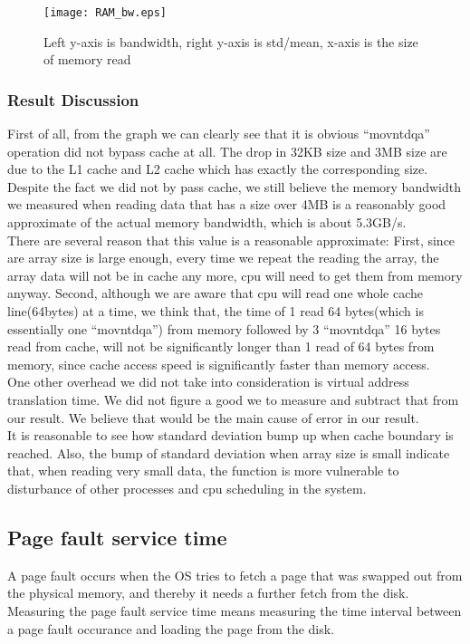 \documentclass{article} %
\begin{document}
\begin{figure}[!htb]
\centering
\texttt{[image: RAM\_bw.eps]}
\caption{Left y-axis is bandwidth, right y-axis is std/mean, x-axis is the size of memory read}
\label{fig:ram_bw}
\end{figure}

\subsubsection{Result Discussion}
First of all, from the graph we can clearly see that it is obvious ``movntdqa'' operation did not bypass cache at all. The drop in 32KB size and 3MB size are due to the L1 cache and L2 cache which has exactly the corresponding size. Despite the fact we did not by pass cache, we still believe the memory bandwidth we measured when reading data that has a size over 4MB is a reasonably good approximate of the actual memory bandwidth, which is about 5.3GB/s.\\
There are several reason that this value is a reasonable approximate: First, since are array size is large enough, every time we repeat the reading the array, the array data will not be in cache any more, cpu will need to get them from memory anyway. Second, although we are aware that cpu will read one whole cache line(64bytes) at a time, we think that, the time of 1 read 64 bytes(which is essentially one ``movntdqa'') from memory followed by 3 ``movntdqa'' 16 bytes read from cache, will not be significantly longer than 1 read of 64 bytes from memory, since cache access speed is significantly faster than memory access.\\
One other overhead we did not take into consideration is virtual address translation time. We did not figure a good we to measure and subtract that from our result. We believe that would be the main cause of error in our result.\\
It is reasonable to see how standard deviation bump up when cache boundary is reached. Also, the bump of standard deviation when array size is small indicate that, when reading very small data, the function is more vulnerable to disturbance of other processes and cpu scheduling in the system.\\

\subsection{Page fault service time}
A page fault occurs when the OS tries to fetch a page that was swapped out from the physical memory, and thereby it needs a further fetch from the disk. Measuring the page fault service time means measuring the time interval between a page fault occurance and loading the page from the disk.
\end{document}
